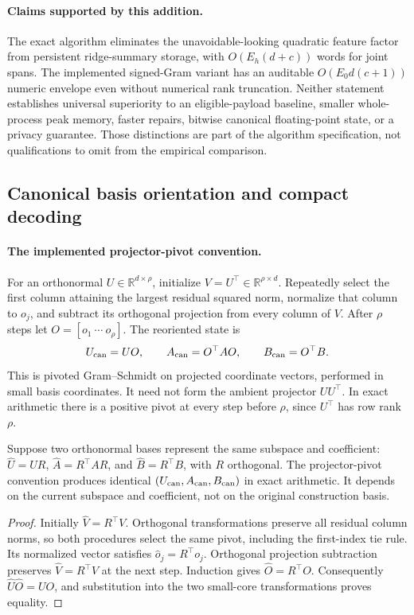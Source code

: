 \paragraph{Claims supported by this addition.}
The exact algorithm eliminates the unavoidable-looking quadratic feature
factor from persistent ridge-summary storage, with $O(E_h(d+c))$ words for
joint spans. The implemented signed-Gram variant has an auditable
$O(E_0d(c+1))$ numeric envelope even without numerical rank truncation.
Neither statement establishes universal superiority to an eligible-payload
baseline, smaller whole-process peak memory, faster repairs, bitwise
canonical floating-point state, or a privacy guarantee. Those distinctions
are part of the algorithm specification, not qualifications to omit from
the empirical comparison.

\subsection{Canonical basis orientation and compact decoding}
\paragraph{The implemented projector-pivot convention.}
For an orthonormal $U\in\mathbb R^{d\times\rho}$, initialize
$V=U^\top\in\mathbb R^{\rho\times d}$. Repeatedly select the first column
attaining the largest residual squared norm, normalize that column to
$o_j$, and subtract its orthogonal projection from every column of $V$.
After $\rho$ steps let $O=[o_1\ \cdots\ o_\rho]$. The reoriented state is
\[
 U_{\rm can}=UO,\qquad A_{\rm can}=O^\top AO,\qquad
 B_{\rm can}=O^\top B.
\]
This is pivoted Gram--Schmidt on projected coordinate vectors, performed
in small basis coordinates. It need not form the ambient projector
$UU^\top$. In exact arithmetic there is a positive pivot at every step
before $\rho$, since $U^\top$ has row rank $\rho$.

\begin{proposition}
Suppose two orthonormal bases represent the same subspace and coefficient:
$\widehat U=UR$, $\widehat A=R^\top AR$, and
$\widehat B=R^\top B$, with $R$ orthogonal. The projector-pivot convention
produces identical $(U_{\rm can},A_{\rm can},B_{\rm can})$ in exact
arithmetic. It depends on the current subspace and coefficient, not on
the original construction basis.
\end{proposition}
\begin{proof}
Initially $\widehat V=R^\top V$. Orthogonal transformations preserve all
residual column norms, so both procedures select the same pivot, including
the first-index tie rule. Its normalized vector satisfies
$\widehat o_j=R^\top o_j$. Orthogonal projection subtraction preserves
$\widehat V=R^\top V$ at the next step. Induction gives
$\widehat O=R^\top O$. Consequently $\widehat U\widehat O=UO$, and
substitution into the two small-core transformations proves equality.
\end{proof}

